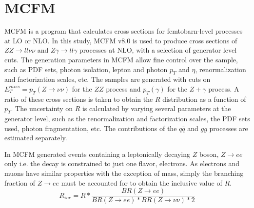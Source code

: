 \documentclass[11pt,a4paper]{report}
\newcommand{\ZZ}{$ZZ\to ll\nu\nu$ }
\newcommand{\Zg}{$Z\gamma\to ll\gamma$ }
\begin{document}
\newpage
\section{MCFM}
MCFM is a program that calculates cross sections for femtobarn-level processes at LO or NLO. In this study, MCFM v8.0 \cite{MCFM} is used to produce cross sections of \ZZ and \Zg processes at NLO, with a selection of generator level cuts. The generation parameters in MCFM allow fine control over the sample, such as PDF sets, photon isolation, lepton and photon $p_T$ and $\eta$, renormalization and factorization scales, etc. The samples are generated with cuts on $E_T^{miss} = p_T(Z\to \nu\nu)$ for the $ZZ$ process and $p_T(\gamma)$ for the $Z+\gamma$ process. A ratio of these cross sections is taken to obtain the $R$ distribution as a function of $p_T$. The uncertainty on $R$ is calculated by varying several parameters at the generator level, such as the renormalization and factorization scales, the PDF sets used, photon fragmentation, etc. The contributions of the $q \bar{q}$ and $gg$ processes are estimated separately.

In MCFM generated events containing a leptonically decaying $Z$ boson, $Z\rightarrow ee$ only i.e. the decay is constrained to just one flavor, electrons. As electrons and muons have similar properties with the exception of mass, simply the branching fraction of $Z\rightarrow ee$ must be accounted for to obtain the inclusive value of $R$.
\begin{equation}\label{eq:R_inc}
	R_{inc} = R * \frac{BR(Z\rightarrow ee)}{BR(Z \rightarrow ee)*BR(Z\rightarrow \nu\nu)*2}
\end{equation}
\end{document}
